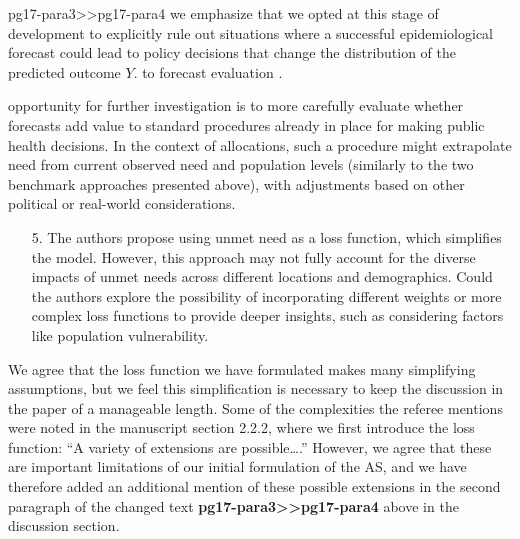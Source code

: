 \documentclass{article}
\begin{document}
\begin{mybox}{pg17-para3>>pg17-para4}
\DIFaddend we emphasize that we opted at this stage of
development to explicitly rule out situations where a successful
epidemiological forecast could lead to policy decisions that change the
distribution of the predicted outcome $Y$. \DIFdelbegin {}\DIFdelend
\DIFaddbegin {}\DIFaddend to forecast evaluation \DIFdelbegin {}\DIFdelend \DIFaddbegin
{}\DIFaddend.

\DIFdelbegin {}\DIFdelend \DIFaddbegin {}\DIFaddend
opportunity for further investigation is to more carefully evaluate whether
forecasts add value to standard  procedures already in place for making public
health decisions. In the context of allocations, such a procedure might
extrapolate need from current observed need and population levels (similarly to
the two benchmark approaches presented above), with adjustments based on other
political or real-world considerations.
\end{mybox}


\begin{quotebar}
\begin{enumerate}
  \item[5.] The authors propose using unmet need as a loss function, which simplifies the model. However, this approach may not fully account for the diverse impacts of unmet needs across different locations and demographics. Could the authors explore the possibility of incorporating different weights or more complex loss functions to provide deeper insights, such as considering factors like population vulnerability.
\end{enumerate}
\end{quotebar}

We agree that the loss function we have formulated makes many simplifying assumptions, but we feel this simplification 
is necessary to keep the discussion in the paper of a manageable length.
Some of the complexities the referee mentions were noted in the manuscript section 2.2.2, where we first introduce the loss function:
“A variety of extensions are possible….”
However, we agree that these are important limitations of our initial formulation of the AS, 
and we have therefore added an additional mention of these possible extensions in the second paragraph of the changed text \textbf{pg17-para3>>pg17-para4} above
in the discussion section.
\end{document}
